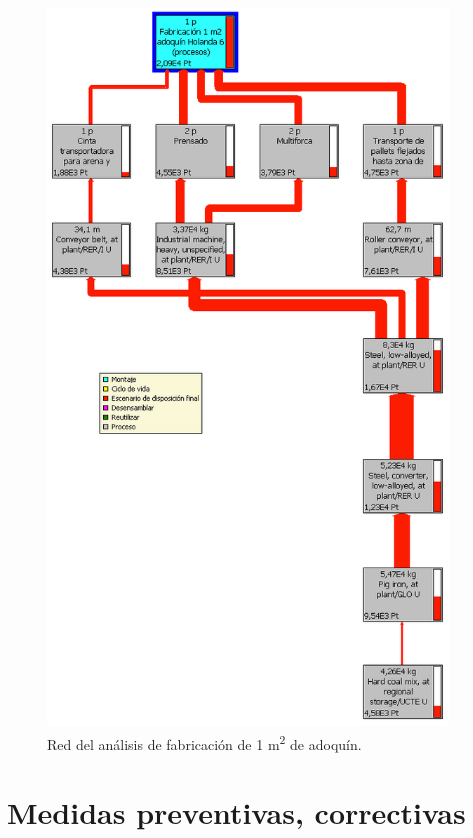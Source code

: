 \begin{figure}[!htb]
\centering
\includegraphics[height=19cm]{img/fabricacion_red.png}
\caption{Red del análisis de fabricación de 1 \si{m^2} de adoquín.}
\label{fig:redfabricacion}
\end{figure}

\section{Medidas preventivas, correctivas}
